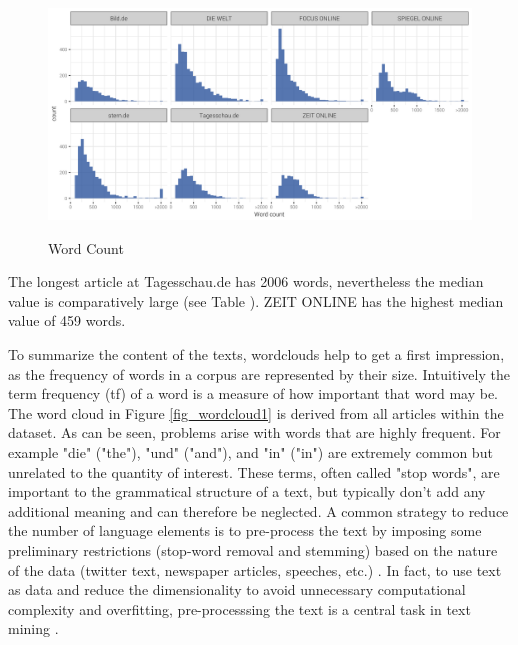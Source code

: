 \documentclass[12pt,a4paper,notitlepage]{article}
\begin{document}
\begin{figure}[H]
	\caption{Word Count}
	\begin{center}
		\includegraphics[width=\textwidth]{../figs/wordcount.png}
		\label{fig_wordcount}
	\end{center}
\end{figure}

The longest article at Tagesschau.de has 2006 words, nevertheless the median value is comparatively large (see Table \label{t_wordcloud}). ZEIT ONLINE has the highest median value of 459 words. 



To summarize the content of the texts, wordclouds help to get a first impression, as the frequency of words in a corpus are represented by their size. Intuitively the term frequency (tf) of a word is a measure of how important that word may be. The word cloud in Figure \ref{fig_wordcloud1} is derived from all articles within the dataset. As can be seen, problems arise with words that are highly frequent. For example "die" ("the"), "und" ("and"), and "in" ("in") are extremely common but unrelated to the quantity of interest. These terms, often called "stop words", are important to the grammatical structure of a text, but typically don't add any additional meaning and can therefore be neglected. A common strategy to reduce the number of language elements is to pre-process the text by imposing some preliminary restrictions (stop-word removal and stemming) based on the nature of the data (twitter text, newspaper articles, speeches, etc.) \citep{gentzkow_text_2017}. In fact, to use text as data and reduce the dimensionality to avoid unnecessary computational complexity and overfitting, pre-processsing the text is a central task in text mining \citep{bholat_text_2015}.  
\end{document}
